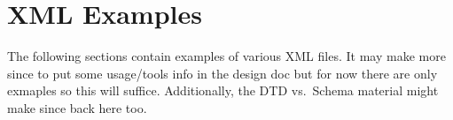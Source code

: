 %
%
%

\section{XML Examples}
\label{append:xml-overview}

The following sections contain examples of various XML files.  It may
make more since to put some usage/tools info in the design doc but for
now there are only exmaples so this will suffice.  Additionally, the
DTD vs.\ Schema material might make since back here too.

\subsection{}
